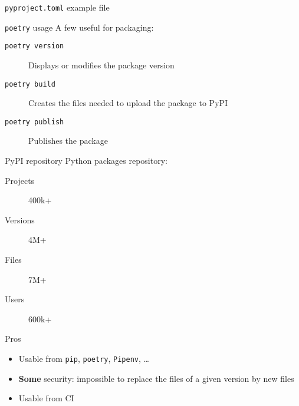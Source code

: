 \begin{frame}{\texttt{pyproject.toml} example file}
\end{frame}

\begin{frame}{\texttt{poetry} usage}
  A few useful  for packaging:
  \begin{description}
    \item[\texttt{poetry version}] Displays or modifies the package version
    \item[\texttt{poetry build}] Creates the files needed to upload the package to PyPI
    \item[\texttt{poetry publish}] Publishes the package
  \end{description}
\end{frame}

\begin{frame}{PyPI repository}
  Python packages repository:

  \begin{description}
    \item[Projects] 400k+
    \item[Versions] 4M+
    \item[Files] 7M+
    \item[Users] 600k+
  \end{description}
\end{frame}

\begin{frame}{Pros}
  \begin{itemize}
    \item Usable from \texttt{pip}, \texttt{poetry}, \texttt{Pipenv}, …
    \item \textbf{Some} security: impossible to replace the files of a given version by new files
    \item Usable from CI
  \end{itemize}
\end{frame}
